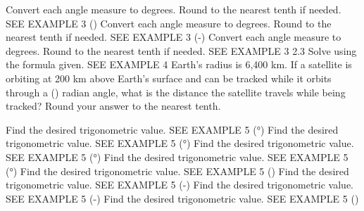 \documentclass{article}
\newenvironment{practice}[2]{}{}        %
\newcommand{\answer}[1]{}               %
\begin{document}
\begin{practice}{32}{1}
Convert each angle measure to degrees. Round to the nearest tenth if needed. SEE EXAMPLE 3
() \answer{150°}
\end{practice}
\begin{practice}{33}{1}
Convert each angle measure to degrees. Round to the nearest tenth if needed. SEE EXAMPLE 3
(-\frac{}) \answer{-30°}
\end{practice}
\begin{practice}{34}{1}
Convert each angle measure to degrees. Round to the nearest tenth if needed. SEE EXAMPLE 3
2.3 \answer{131.8°}
\end{practice}
\begin{practice}{35}{2}
Solve using the formula given. SEE EXAMPLE 4
Earth's radius is 6,400 km. If a satellite is orbiting at 200 km above Earth's surface and can be tracked while it orbits through a (\frac{}) radian angle, what is the distance the satellite travels while being tracked? Round your answer to the nearest tenth.
\answer{6,911.5 km (using (\pi)); 6,908 km (using 3.14)}
\end{practice}
\begin{practice}{36}{1}
Find the desired trigonometric value. SEE EXAMPLE 5
(°) \answer{-1}
\end{practice}
\begin{practice}{37}{1}
Find the desired trigonometric value. SEE EXAMPLE 5
(°) \answer{-1}
\end{practice}
\begin{practice}{38}{1}
Find the desired trigonometric value. SEE EXAMPLE 5
(°) \answer{undefined}
\end{practice}
\begin{practice}{39}{1}
Find the desired trigonometric value. SEE EXAMPLE 5
(°) \answer{0}
\end{practice}
\begin{practice}{40}{1}
Find the desired trigonometric value. SEE EXAMPLE 5
(\sin{}) \answer{-1}
\end{practice}
\begin{practice}{41}{1}
Find the desired trigonometric value. SEE EXAMPLE 5
(\tan-\frac{}) \answer{undefined}
\end{practice}
\begin{practice}{42}{1}
Find the desired trigonometric value. SEE EXAMPLE 5
(\tan-\pi) \answer{0}
\end{practice}
\begin{practice}{43}{1}
Find the desired trigonometric value. SEE EXAMPLE 5
(\pi) \answer{-1}
\end{practice}
\end{document}
